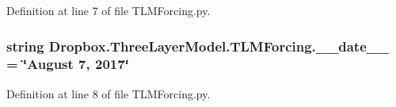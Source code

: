 Definition at line 7 of file T\+L\+M\+Forcing.\+py.

\hypertarget{namespaceDropbox_1_1ThreeLayerModel_1_1TLMForcing_ab87f7e7ab2c5089f05d28b3c8f0d39dd}{
\subsubsection[{\+\_\+\+\_\+date\+\_\+\+\_\+}]{\setlength{\rightskip}{0pt plus 5cm}string Dropbox.\+Three\+Layer\+Model.\+T\+L\+M\+Forcing.\+\_\+\+\_\+date\+\_\+\+\_\+ = \char`\"{}August 7, 2017\char`\"{}}}\label{namespaceDropbox_1_1ThreeLayerModel_1_1TLMForcing_ab87f7e7ab2c5089f05d28b3c8f0d39dd}


Definition at line 8 of file T\+L\+M\+Forcing.\+py.

